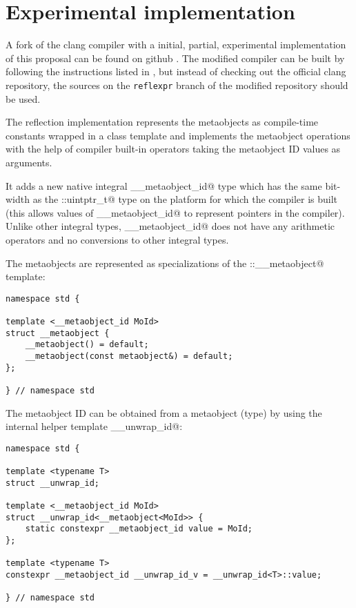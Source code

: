 \section{Experimental implementation}
\label{implementation}

A fork of the clang compiler with a initial, partial, experimental implementation
of this proposal can be found on github \cite{ReflexprImplementation}.
The modified compiler can be built by following the instructions listed
in \cite{ClangGettingStarted}, but instead of checking out the official clang
repository, the sources on the \texttt{reflexpr} branch of the modified
repository should be used.

The reflection implementation represents the metaobjects as compile-time
constants wrapped in a class template and implements the metaobject operations
with the help of compiler built-in operators taking the metaobject ID values
as arguments. 

It adds a new native integral \verb@__metaobject_id@ type which has the same
bit-width as the \verb@std::uintptr_t@ type on the platform for which
the compiler is built (this allows values of \verb@__metaobject_id@ to represent
pointers in the compiler). Unlike other integral types, \verb@__metaobject_id@
does not have any arithmetic operators and no conversions to other integral types. 

The metaobjects are represented as specializations of the \verb@std::__metaobject@
template: 

\begin{verbatim}
namespace std {

template <__metaobject_id MoId>
struct __metaobject {
	__metaobject() = default;
	__metaobject(const metaobject&) = default;
};

} // namespace std
\end{verbatim}

The metaobject ID can be obtained from a metaobject (type) by using the internal
helper template \verb@__unwrap_id@: 

\begin{verbatim}
namespace std {

template <typename T>
struct __unwrap_id;

template <__metaobject_id MoId>
struct __unwrap_id<__metaobject<MoId>> {
	static constexpr __metaobject_id value = MoId;
};

template <typename T>
constexpr __metaobject_id __unwrap_id_v = __unwrap_id<T>::value;

} // namespace std
\end{verbatim}

